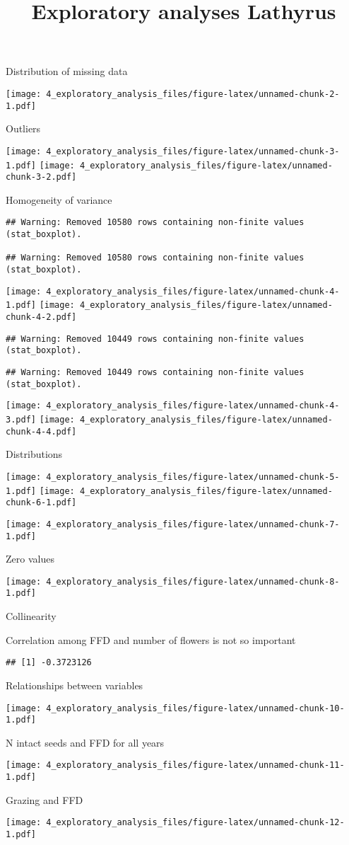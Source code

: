 \documentclass[]{article}
\title{Exploratory analyses Lathyrus}
\author{}
\date{}
\begin{document}
\maketitle

Distribution of missing data

\texttt{[image: 4\_exploratory\_analysis\_files/figure-latex/unnamed-chunk-2-1.pdf]}

Outliers

\texttt{[image: 4\_exploratory\_analysis\_files/figure-latex/unnamed-chunk-3-1.pdf]}
\texttt{[image: 4\_exploratory\_analysis\_files/figure-latex/unnamed-chunk-3-2.pdf]}

Homogeneity of variance

\begin{verbatim}
## Warning: Removed 10580 rows containing non-finite values (stat_boxplot).

## Warning: Removed 10580 rows containing non-finite values (stat_boxplot).
\end{verbatim}

\texttt{[image: 4\_exploratory\_analysis\_files/figure-latex/unnamed-chunk-4-1.pdf]}
\texttt{[image: 4\_exploratory\_analysis\_files/figure-latex/unnamed-chunk-4-2.pdf]}

\begin{verbatim}
## Warning: Removed 10449 rows containing non-finite values (stat_boxplot).
\end{verbatim}

\begin{verbatim}
## Warning: Removed 10449 rows containing non-finite values (stat_boxplot).
\end{verbatim}

\texttt{[image: 4\_exploratory\_analysis\_files/figure-latex/unnamed-chunk-4-3.pdf]}
\texttt{[image: 4\_exploratory\_analysis\_files/figure-latex/unnamed-chunk-4-4.pdf]}

Distributions

\texttt{[image: 4\_exploratory\_analysis\_files/figure-latex/unnamed-chunk-5-1.pdf]}
\texttt{[image: 4\_exploratory\_analysis\_files/figure-latex/unnamed-chunk-6-1.pdf]}

\texttt{[image: 4\_exploratory\_analysis\_files/figure-latex/unnamed-chunk-7-1.pdf]}

Zero values

\texttt{[image: 4\_exploratory\_analysis\_files/figure-latex/unnamed-chunk-8-1.pdf]}

Collinearity

Correlation among FFD and number of flowers is not so important

\begin{verbatim}
## [1] -0.3723126
\end{verbatim}

Relationships between variables

\texttt{[image: 4\_exploratory\_analysis\_files/figure-latex/unnamed-chunk-10-1.pdf]}

N intact seeds and FFD for all years

\texttt{[image: 4\_exploratory\_analysis\_files/figure-latex/unnamed-chunk-11-1.pdf]}

Grazing and FFD

\texttt{[image: 4\_exploratory\_analysis\_files/figure-latex/unnamed-chunk-12-1.pdf]}
\end{document}
